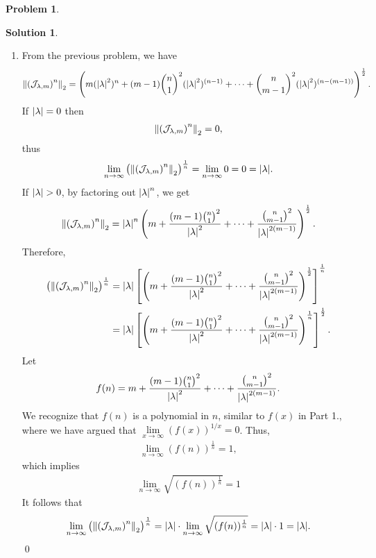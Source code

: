 \documentclass{book}
\theoremstyle{definition}
\newtheorem*{prob*}{Problem}
\newtheorem*{sln*}{Solution}
\newcommand{\jor}{\mathcal{J}}
\begin{document}
\begin{prob*}
\begin{sln*}
\begin{enumerate}
			
			\newpage
			
			
			\item From the previous problem, we have
			\begin{align*}
			\norm{\left(\jor_{\lambda,m}\right)^n}_2 = \left( m(\abs{\lambda}^{2})^n  + (m-1){n\choose 1}^2(\abs{\lambda}^{2})^{(n-1)} + \dots + {n\choose m-1}^2(\abs{  \lambda}^{2})^{(n-(m-1))}  \right)^\frac{1}{2}.
			\end{align*}
			If $\abs{\lambda} = 0$ then 
			\begin{align*}
			\norm{\left(\jor_{\lambda,m}\right)^n}_2 = 0,
			\end{align*}
			thus 
			\begin{align*}
			\lim\limits_{n\to\infty} \left(\norm{\left(\jor_{\lambda,m}\right)^n}_2\right)^{\frac{1}{n}} = \lim\limits_{n\to\infty} 0  = 0= \abs{\lambda}.
			\end{align*}
			If $\abs{\lambda} > 0$, by factoring out $\abs{\lambda}^n$, we get
			\begin{align*}
			\norm{\left(\jor_{\lambda,m}\right)^n}_2 = \abs{\lambda}^n \left( m  + \frac{(m-1){n\choose 1}^2}{\abs{\lambda}^2} + \dots + \frac{{n\choose m-1}^2}{\abs{\lambda}^{2(m-1)}}  \right)^\frac{1}{2}.
			\end{align*}
			Therefore,
			\begin{align*}
			\left(  \norm{\left(\jor_{\lambda,m}\right)^n}_2 \right)^{\frac{1}{n}} &= \abs{\lambda}\left[\left( m  + \frac{(m-1){n\choose 1}^2}{\abs{\lambda}^2} + \dots + \frac{{n\choose m-1}^2}{\abs{\lambda}^{2(m-1)}}  \right)^\frac{1}{2}\right]^{\frac{1}{n}}\\
			&= \abs{\lambda}\left[\left( m + \frac{(m-1){n\choose 1}^2}{\abs{\lambda}^2} + \dots + \frac{{n\choose m-1}^2}{\abs{\lambda}^{2(m-1)}}  \right)^\frac{1}{n}\right]^{\frac{1}{2}}.
			\end{align*}
			Let
			\begin{align*}
			f(n) = m  + \frac{(m-1){n\choose 1}^2}{\abs{\lambda}^2} + \dots + \frac{{n\choose m-1}^2}{\abs{\lambda}^{2(m-1)}}.
			\end{align*}
			We recognize that $f(n)$ is a polynomial in $n$, similar to $f(x)$ in Part 1., where we have argued that $\lim\limits_{x\to\infty} (f(x))^{1/x} = 0$. Thus, 
			\begin{align*}
			\lim\limits_{n\to\infty} (f(n))^{\frac{1}{n}} = 1,
			\end{align*}
			which implies
			\begin{align*}
			\lim\limits_{n\to\infty} \sqrt{(f(n))^{\frac{1}{n}}} = 1
			\end{align*}
			It follows that 
			\begin{align*}
			\lim\limits_{n\to\infty} \left(  \norm{\left(\jor_{\lambda,m}\right)^n}_2 \right)^{\frac{1}{n}} = \abs{\lambda}\cdot\lim\limits_{n\to\infty}\sqrt{(f(n))^{\frac{1}{n}}} = \abs{\lambda}\cdot 1 = \abs{\lambda}.
			\end{align*}\qed
		\end{enumerate}
	\end{sln*}
	
\end{prob*}
\end{document}
